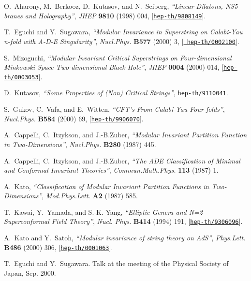 \documentclass[a4paper,12pt]{article}
\numberwithin{equation}{section}
\begin{document}
\begin{thebibliography}{10}
O.~Aharony, M.~Berkooz, D.~Kutasov, and N.~Seiberg, {\it ``{Linear Dilatons,
  NS5-branes and Holography}''},  {\em JHEP} {\bf 9810} (1998) 004,
  [\href{http://xxx.lanl.gov/abs/hep-th/9808149}{{\tt hep-th/9808149}}].

T.~Eguchi and Y.~Sugawara, {\it ``{Modular Invariance in Superstring on
  Calabi-Yau n-fold with A-D-E Singularity}''},  {\em Nucl.Phys.} {\bf B577}
  (2000) 3, [\href{http://xxx.lanl.gov/abs/hep-th/0002100}{{\tt
  hep-th/0002100}}].

S.~Mizoguchi, {\it ``{Modular Invariant Critical Superstrings on
  Four-dimensional Minkowski Space \myHighlight{$\times$}\coordHE{} Two-dimensional Black Hole}''},
  {\em JHEP} {\bf 0004} (2000) 014,
  [\href{http://xxx.lanl.gov/abs/hep-th/0003053}{{\tt hep-th/0003053}}].

D.~Kutasov, {\it ``{Some Properties of (Non) Critical Strings}''},
  \href{http://xxx.lanl.gov/abs/hep-th/9110041}{{\tt hep-th/9110041}}.

S.~Gukov, C.~Vafa, and E.~Witten, {\it ``{CFT's From Calabi-Yau Four-folds}''},
   {\em Nucl.Phys.} {\bf B584} (2000) 69,
  [\href{http://xxx.lanl.gov/abs/hep-th/9906070}{{\tt hep-th/9906070}}].

A.~Cappelli, C.~Itzykson, and J.-B.Zuber, {\it ``{Modular Invariant Partition
  Function in Two-Dimensions}''},  {\em Nucl.Phys.} {\bf B280} (1987) 445.

A.~Cappelli, C.~Itzykson, and J.-B.Zuber, {\it ``{The ADE Classification of
  Minimal and \coordHE{} Conformal Invariant Theories}''},  {\em
  Commun.Math.Phys.} {\bf 113} (1987) 1.

A.~Kato, {\it ``{Classification of Modular Invariant Partition Functions in
  Two-Dimensions}''},  {\em Mod.Phys.Lett.} {\bf A2} (1987) 585.

T.~Kawai, Y.~Yamada, and S.-K. Yang, {\it ``{Elliptic Genera and N=2
  Superconformal Field Theory}''},  {\em Nucl. Phys.} {\bf B414} (1994) 191,
  [\href{http://xxx.lanl.gov/abs/hep-th/9306096}{{\tt hep-th/9306096}}].

A.~Kato and Y.~Satoh, {\it ``{Modular invariance of string theory on
  AdS\coordHE{}}''},  {\em Phys.Lett.} {\bf B486} (2000) 306,
  [\href{http://xxx.lanl.gov/abs/hep-th/0001063}{{\tt hep-th/0001063}}].

T.~Eguchi and Y.~Sugawara.
\newblock Talk at the meeting of the Physical Society of Japan, Sep. 2000.


\end{thebibliography}
\end{document}
